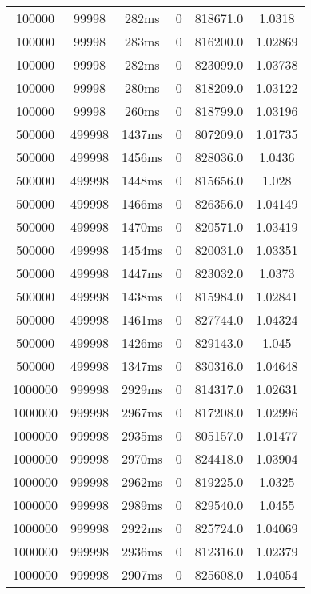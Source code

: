\documentclass[./main.tex]{subfiles}
\begin{document}
\begin{table}
\begin{tabular}{ c | c | c | c | c | c }
        \rowcolor{lightgray} 100000 & 99998 & 282ms & 0 & 818671.0 & 1.0318 \\
        100000 & 99998 & 283ms & 0 & 816200.0 & 1.02869 \\
        100000 & 99998 & 282ms & 0 & 823099.0 & 1.03738 \\
        100000 & 99998 & 280ms & 0 & 818209.0 & 1.03122 \\
        100000 & 99998 & 260ms & 0 & 818799.0 & 1.03196 \\
        \hline
        500000 & 499998 & 1437ms & 0 & 807209.0 & 1.01735 \\
        500000 & 499998 & 1456ms & 0 & 828036.0 & 1.0436 \\
        500000 & 499998 & 1448ms & 0 & 815656.0 & 1.028 \\
        500000 & 499998 & 1466ms & 0 & 826356.0 & 1.04149 \\
        500000 & 499998 & 1470ms & 0 & 820571.0 & 1.03419 \\
        500000 & 499998 & 1454ms & 0 & 820031.0 & 1.03351 \\
        \rowcolor{lightgray} 500000 & 499998 & 1447ms & 0 & 823032.0 & 1.0373 \\
        500000 & 499998 & 1438ms & 0 & 815984.0 & 1.02841 \\
        500000 & 499998 & 1461ms & 0 & 827744.0 & 1.04324 \\
        500000 & 499998 & 1426ms & 0 & 829143.0 & 1.045 \\
        500000 & 499998 & 1347ms & 0 & 830316.0 & 1.04648 \\
        \hline
        1000000 & 999998 & 2929ms & 0 & 814317.0 & 1.02631 \\
        \rowcolor{lightgray} 1000000 & 999998 & 2967ms & 0 & 817208.0 & 1.02996 \\
        1000000 & 999998 & 2935ms & 0 & 805157.0 & 1.01477 \\
        1000000 & 999998 & 2970ms & 0 & 824418.0 & 1.03904 \\
        1000000 & 999998 & 2962ms & 0 & 819225.0 & 1.0325 \\
        1000000 & 999998 & 2989ms & 0 & 829540.0 & 1.0455 \\
        1000000 & 999998 & 2922ms & 0 & 825724.0 & 1.04069 \\
        1000000 & 999998 & 2936ms & 0 & 812316.0 & 1.02379 \\
        1000000 & 999998 & 2907ms & 0 & 825608.0 & 1.04054 \\

\end{tabular}
\end{table}
\end{document}
